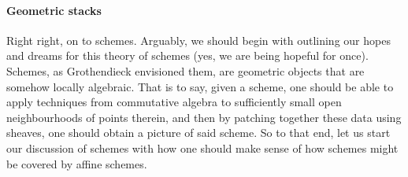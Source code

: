                     \begin{example}
                        
                    \end{example}
            
                \paragraph{Geometric stacks}
                    Right right, on to schemes. Arguably, we should begin with outlining our hopes and dreams for this theory of schemes (yes, we are being hopeful for once). Schemes, as Grothendieck envisioned them, are geometric objects that are somehow locally algebraic. That is to say, given a scheme, one should be able to apply techniques from commutative algebra to sufficiently small open neighbourhoods of points therein, and then by patching together these data using sheaves, one should obtain a picture of said scheme. So to that end, let us start our discussion of schemes with how one should make sense of how schemes might be covered by affine schemes. 
                
